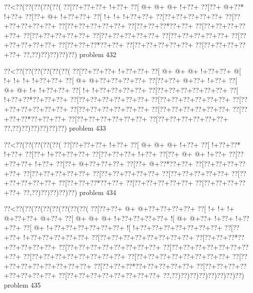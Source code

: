 \vbox{\vbox{\goo
\0??<\0??(\0??(\0??(\0??(\0??(
\0??[\0??+\0??+\0??+\- !+\0??+
\0??[\- @+\- @+\- @+\- !+\0??+
\0??[\0??+\- @+\0??*\- !+\0??+
\0??[\0??+\- @+\- !+\0??+\0??+
\0??[\- !+\- !+\- !+\0??+\0??+
\0??[\0??+\0??+\0??+\0??+\0??+
\0??[\0??+\0??+\0??+\0??+\0??+
\0??[\0??+\0??+\0??+\0??+\0??+
\0??[\0??+\0??+\0??*\0??+\0??+
\0??[\0??+\0??+\0??+\0??+\0??+
\0??[\0??+\0??+\0??+\0??+\0??+
\0??[\0??+\0??+\0??+\0??+\0??+
\0??[\0??+\0??+\0??+\0??+\0??+
\0??[\0??+\0??+\0??+\0??+\0??+
\0??[\0??+\0??+\0??*\0??+\0??+
\0??[\0??+\0??+\0??+\0??+\0??+
\0??[\0??+\0??+\0??+\0??+\0??+
\0??,\0??)\0??)\0??)\0??)\0??)
}
\hfil problem 432\hfil\break
}

\vbox{\vbox{\goo
\0??<\0??(\0??(\0??(\0??(\0??(\0??(
\0??[\0??+\0??+\0??+\- !+\0??+\0??+
\0??[\- @+\- @+\- @+\- !+\0??+\0??+
\- @[\- !+\- !+\- !+\- !+\0??+\0??+
\0??[\- @+\- @+\0??+\0??+\0??+\0??+
\0??[\0??+\0??+\- @+\0??+\- !+\0??+
\0??[\- @+\- @+\- !+\- !+\0??+\0??+
\0??[\- !+\- !+\0??+\0??+\0??+\0??+
\0??[\0??+\0??+\0??+\0??+\0??+\0??+
\0??[\- !+\0??+\0??*\0??+\0??+\0??+
\0??[\0??+\0??+\0??+\0??+\0??+\0??+
\0??[\0??+\0??+\0??+\0??+\0??+\0??+
\0??[\0??+\0??+\0??+\0??+\0??+\0??+
\0??[\0??+\0??+\0??+\0??+\0??+\0??+
\0??[\0??+\0??+\0??+\0??+\0??+\0??+
\0??[\0??+\0??+\0??*\0??+\0??+\0??+
\0??[\0??+\0??+\0??+\0??+\0??+\0??+
\0??[\0??+\0??+\0??+\0??+\0??+\0??+
\0??,\0??)\0??)\0??)\0??)\0??)\0??)
}
\hfil problem 433\hfil\break
}

\vbox{\vbox{\goo
\0??<\0??(\0??(\0??(\0??(\0??(
\0??[\0??+\0??+\0??+\- !+\0??+
\0??[\- @+\- @+\- @+\- !+\0??+
\0??[\- !+\0??+\0??*\- !+\0??+
\0??[\0??+\- !+\0??+\0??+\0??+
\0??[\0??+\0??+\0??+\- !+\0??+
\0??[\0??+\- @+\- @+\- !+\0??+
\0??[\0??+\0??+\0??+\- !+\0??+
\0??[\0??+\- @+\0??+\0??+\0??+
\0??[\0??+\- @+\0??*\0??+\0??+
\0??[\0??+\0??+\0??+\0??+\0??+
\0??[\0??+\0??+\0??+\0??+\0??+
\0??[\0??+\0??+\0??+\0??+\0??+
\0??[\0??+\0??+\0??+\0??+\0??+
\0??[\0??+\0??+\0??+\0??+\0??+
\0??[\0??+\0??+\0??*\0??+\0??+
\0??[\0??+\0??+\0??+\0??+\0??+
\0??[\0??+\0??+\0??+\0??+\0??+
\0??,\0??)\0??)\0??)\0??)\0??)
}
\hfil problem 434\hfil\break
}

\vbox{\vbox{\goo
\0??<\0??(\0??(\0??(\0??(\0??(\0??(\0??(\0??(
\0??[\0??+\0??+\- @+\- @+\0??+\0??+\0??+\0??+
\0??[\- !+\- !+\- !+\- @+\0??+\0??+\- @+\0??+
\0??[\- @+\- @+\- @+\- !+\0??+\0??+\0??+\0??+
\- ![\- @+\- @+\0??+\- !+\0??+\- !+\0??+\0??+
\0??[\- @+\- !+\0??+\0??+\0??+\0??+\0??+\0??+
\- ![\- !+\0??+\0??+\0??+\0??+\0??+\0??+\0??+
\0??[\0??+\0??+\- !+\0??+\0??+\0??+\0??+\0??+
\0??[\0??+\0??+\0??+\0??+\0??+\0??+\0??+\0??+
\0??[\0??+\0??+\0??*\0??+\0??+\0??+\0??+\0??+
\0??[\0??+\0??+\0??+\0??+\0??+\0??+\0??+\0??+
\0??[\0??+\0??+\0??+\0??+\0??+\0??+\0??+\0??+
\0??[\0??+\0??+\0??+\0??+\0??+\0??+\0??+\0??+
\0??[\0??+\0??+\0??+\0??+\0??+\0??+\0??+\0??+
\0??[\0??+\0??+\0??+\0??+\0??+\0??+\0??+\0??+
\0??[\0??+\0??+\0??*\0??+\0??+\0??+\0??+\0??+
\0??[\0??+\0??+\0??+\0??+\0??+\0??+\0??+\0??+
\0??[\0??+\0??+\0??+\0??+\0??+\0??+\0??+\0??+
\0??,\0??)\0??)\0??)\0??)\0??)\0??)\0??)\0??)
}
\hfil problem 435\hfil\break
}

